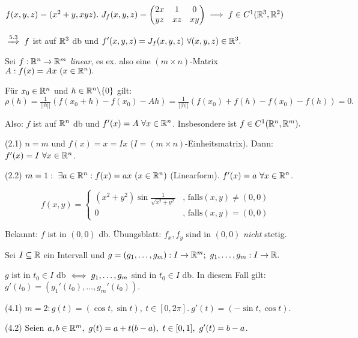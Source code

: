 \documentclass[a4paper,twoside,DIV15,BCOR12mm]{scrbook}
\begin{document}
\begin{beispiele}
\item $f(x,y,z) = (x^2+y, xyz).\ J_f(x,y,z) = \begin{pmatrix}
2x & 1 & 0\\
yz & xz & xy\end{pmatrix} \implies f \in C^1(\mathbb{R}^3,\mathbb{R}^2)$

$\folgtnach{5.3} f$ ist auf $\mathbb{R}^3$ db und $f'(x,y,z) = J_f(x,y,z)\ \forall (x,y,z) \in \mathbb{R}^3.$

\item Sei $f:\mathbb{R}^n \to \mathbb{R}^m$ \emph{linear}, es ex. also eine $(m \times n)$-Matrix $A:f(x) = Ax\ (x \in \mathbb{R}^n).$

Für $x_0 \in \mathbb{R}^n$ und $h \in \mathbb{R}^n \backslash\{0\}$ gilt:\\
$\rho(h) = \frac{1}{||h||}(f(x_0+h) - f(x_0) - Ah) = \frac{1}{||h||}(f(x_0) + f(h) - f(x_0) - f(h)) = 0.$

Also: $f$ ist auf $\mathbb{R}^n$ db und $f'(x) = A\ \forall x \in \mathbb{R}^n$. Insbesondere ist $f \in C^1(\mathbb{R}^n,\mathbb{R}^m).$

\item[(2.1)] $n = m$ und $f(x) = x = Ix$ ($I = (m \times n)$-Einheitsmatrix). Dann: $f'(x) = I\ \forall x \in \mathbb{R}^n$.

\item[(2.2)] $m = 1:\ \exists a \in \mathbb{R}^n: f(x) = ax\ (x \in \mathbb{R}^n)$ (Linearform). $f'(x) = a\ \forall x \in \mathbb{R}^n$.

\item $$f(x,y) = \begin{cases}
(x^2+y^2) \sin \frac{1}{\sqrt{x^2+y^2}} & \text{, falls} (x,y) \ne (0,0)\\
0 & \text{, falls} (x,y) = (0,0)\end{cases}$$

Bekannt: $f$ ist in $(0,0)$ db. \"Ubungsblatt: $f_x,f_y$ sind in $(0,0)$ \emph{nicht} stetig.

\item Sei $I \subseteq \mathbb{R}$ ein Intervall und $g = (g_1,\ldots,g_m): I \to \MdR^m;\ g_1,\ldots,g_m: I \to \MdR.$

$g$ ist in $t_0 \in I$ db $\iff g_1,\ldots,g_m$ sind in $t_0 \in I$ db. In diesem Fall gilt: $g'(t_0) = (g_1'(t_0),\ldots,g_m'(t_0)).$

\item[(4.1)] $m = 2: g(t) = (\cos t,\sin t),\ t \in [0,2\pi].\ g'(t) = (-\sin t,\cos t).$
\item[(4.2)] Seien $a,b \in \MdR^m,\ g(t) = a+t(b-a),\ t \in [0,1],\ g'(t) = b-a$.
\end{beispiele}
\end{document}
